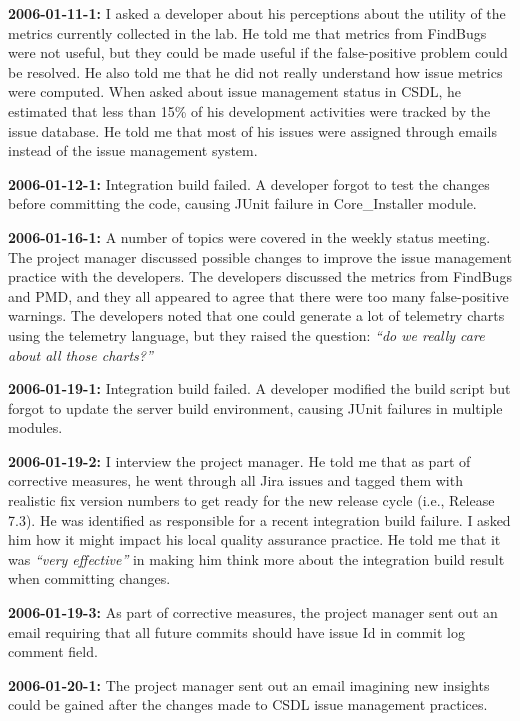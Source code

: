 \textbf{2006-01-11-1:}
I asked a developer about his perceptions about the utility of the metrics currently collected in the lab. He told me that metrics from FindBugs were not useful, but they could be made useful if the false-positive problem could be resolved. He also told me that he did not really understand how issue metrics were computed. 
When asked about issue management status in CSDL, he estimated that less than 15\% of his development activities were tracked by the issue database. He told me that most of his issues were assigned through emails instead of the issue management system.

\textbf{2006-01-12-1:}
Integration build failed. A developer forgot to test the changes before committing the code, causing JUnit failure in Core\_Installer module.

\textbf{2006-01-16-1:}
A number of topics were covered in the weekly status meeting.
The project manager discussed possible changes to improve the issue management practice with the developers.
The developers discussed the metrics from FindBugs and PMD, and they all appeared to agree that there were too many false-positive warnings.
The developers noted that one could generate a lot of telemetry charts using the telemetry language, but they raised the question: \textit{``do we really care about all those charts?''}

\textbf{2006-01-19-1:}
Integration build failed. A developer modified the build script but forgot to update the server build environment, causing JUnit failures in multiple modules.

\textbf{2006-01-19-2:}
I interview the project manager. He told me that as part of corrective measures, he went through all Jira issues and tagged them with realistic fix version numbers to get ready for the new release cycle (i.e., Release 7.3).
He was identified as responsible for a recent integration build failure. I asked him how it might impact his local quality assurance practice. He told me that it was \textit{``very effective''} in making him think more about the integration build result when committing changes.%

\textbf{2006-01-19-3:}
As part of corrective measures, the project manager sent out an email requiring that all future commits should have issue Id in commit log comment field.

\textbf{2006-01-20-1:}
The project manager sent out an email imagining new insights could be gained after the changes made to CSDL issue management practices.

